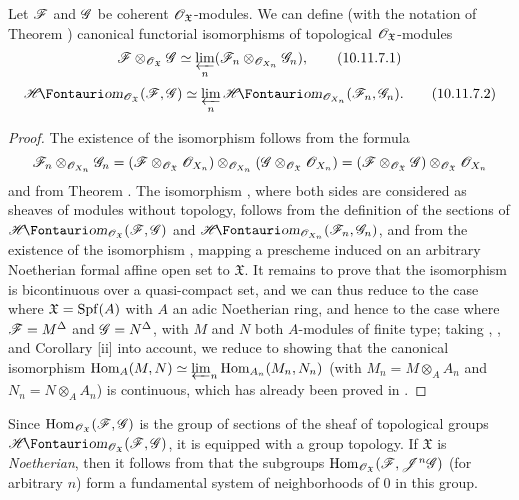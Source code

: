 \begin{proposition}[10.11.7]
\label{I.10.11.7}
Let $\mathscr{F}$ and $\mathscr{G}$ be coherent $\mathscr{O}_\mathfrak{X}$-modules.
We can define (with the notation of Theorem ) canonical functorial isomorphisms of topological $\mathscr{O}_\mathfrak{X}$-modules 
\[
\label{I.10.11.7.1}
  \mathscr{F}\otimes_{\mathscr{O}_\mathfrak{X}}\mathscr{G}\simeq\varprojlim_n(\mathscr{F}_n\otimes_{\mathscr{O}_{X_n}}\mathscr{G}_n),
  \tag{10.11.7.1}
\]
\[
\label{I.10.11.7.2}
  \shHom_{\sh{O}_\mathfrak{X}}(\sh{F},\sh{G})\isoto\varprojlim_n\shHom_{\sh{O}_{X_n}}(\sh{F}_n,\sh{G}_n).
  \tag{10.11.7.2}
\]
\end{proposition}

\begin{proof}
The existence of the isomorphism  follows from the formula
\[
  \mathscr{F}_n\otimes_{\mathscr{O}_{X_n}}\mathscr{G}_n=(\mathscr{F}\otimes_{\mathscr{O}_\mathfrak{X}}\mathscr{O}_{X_n})\otimes_{\mathscr{O}_{X_n}}(\mathscr{G}\otimes_{\mathscr{O}_\mathfrak{X}}\mathscr{O}_{X_n})=(\mathscr{F}\otimes_{\mathscr{O}_\mathfrak{X}}\mathscr{G})\otimes_{\mathscr{O}_\mathfrak{X}}\mathscr{O}_{X_n}
\]
and from Theorem .
The isomorphism , where both sides are considered as sheaves of modules without topology, follows from the definition of the sections of $\shHom_{\sh{O}_\mathfrak{X}}(\sh{F},\sh{G})$ and $\shHom_{\sh{O}_{X_n}}(\sh{F}_n,\sh{G}_n)$, and from the existence of the isomorphism , mapping a prescheme induced on an arbitrary Noetherian formal affine open set to $\mathfrak{X}$.
It remains to prove that the isomorphism  is bicontinuous over a quasi-compact set, and we can thus reduce to the case where $\mathfrak{X}=\operatorname{Spf}(A)$ with $A$ an adic Noetherian ring, and hence  to the case where $\mathscr{F}=M^\Delta$ and $\mathscr{G}=N^\Delta$, with $M$ and $N$ both $A$-modules of finite type; taking , , and Corollary [ii] into account, we reduce to showing that the canonical isomorphism $\operatorname{Hom}_A(M,N)\simeq\varprojlim_n\operatorname{Hom}_{A_n}(M_n,N_n)$ (with $M_n=M\otimes_A A_n$ and $N_n=N\otimes_A A_n$) is continuous, which has already been proved in .
\end{proof}

\begin{env}[10.11.8]
\label{I.10.11.8}
Since $\operatorname{Hom}_{\mathscr{O}_\mathfrak{X}}(\mathscr{F},\mathscr{G})$ is the group of sections of the sheaf of topological groups $\shHom_{\sh{O}_\mathfrak{X}}(\sh{F},\sh{G})$, it is equipped with a group topology.
If $\mathfrak{X}$ is \emph{Noetherian}, then it follows from  that the subgroups $\operatorname{Hom}_{\mathscr{O}_\mathfrak{X}}(\mathscr{F},\mathscr{J}^n\mathscr{G})$ (for arbitrary $n$) form a fundamental system of neighborhoods of $0$ in this group.
\end{env}

